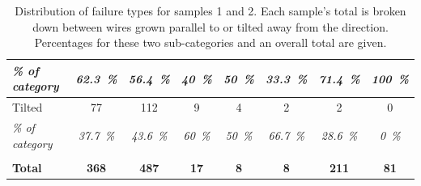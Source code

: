 \begin{table}
\begin{tabular}{l|ccccccc}
        \textit{\% of category} & \textit{\qty{62.3}{\%}} & \textit{\qty{56.4}{\%}} & \textit{\qty{40}{\%}} & \textit{\qty{50}{\%}} & \textit{\qty{33.3}{\%}} & \textit{\qty{71.4}{\%}} & \textit{\qty{100}{\%}} \\ 
        \hline
        Tilted & \num{77} & \num{112} & \num{9} & \num{4} & \num{2} & \num{2} & \num{0} \\
        \textit{\% of category} & \textit{\qty{37.7}{\%}} & \textit{\qty{43.6}{\%}} & \textit{\qty{60}{\%}} & \textit{\qty{50}{\%}} & \textit{\qty{66.7}{\%}} & \textit{\qty{28.6}{\%}} & \textit{\qty{0}{\%}} \\ 
        \hline
        & & & & & & & \\
        \textbf{Total} & \textbf{\num{368}} & \textbf{\num{487}} & \textbf{\num{17}} & \textbf{\num{8}} & \textbf{\num{8}} & \textbf{\num{211}} & \textbf{\num{81}} \\
        \hline
    \end{tabular}
    \caption{Distribution of failure types for samples 1 and 2. Each sample's total is broken down between wires grown parallel to or tilted away from the  direction. Percentages for these two sub-categories and an overall total are given.}
    \label{tab:failures}
\end{table}

